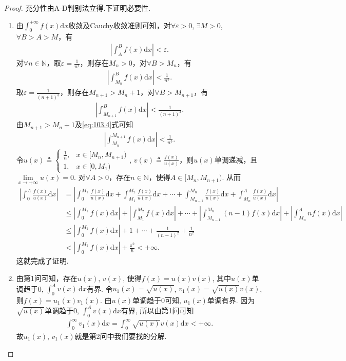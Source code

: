 \documentclass[../../main.tex]{subfiles}
\begin{document}
\begin{proof}
充分性由A-D判别法立得.下证明必要性.
\begin{enumerate}
\item 由$\int_0^{+\infty} f(x)\mathrm{d}x$收敛及Cauchy收敛准则可知，对$\forall \varepsilon >0$, $\exists M>0$, $\forall B>A>M$，有
\begin{align*}
\left| \int_A^B f(x)\mathrm{d}x \right| < \varepsilon.
\end{align*}
对$\forall n\in \mathbb{N}$，取$\varepsilon = \frac{1}{n^3}$，则存在$M_n>0$，对$\forall B>M_n$，有
\begin{align}
\left| \int_{M_n}^B f(x)\mathrm{d}x \right| < \frac{1}{n^3}. \label{eq:103.4}
\end{align}
取$\varepsilon = \frac{1}{(n+1)^3}$，则存在$M_{n+1}>M_n+1$，对$\forall B>M_{n+1}$，有
\begin{align*}
\left| \int_{M_{n+1}}^B f(x)\mathrm{d}x \right| < \frac{1}{(n+1)^3}.
\end{align*}
由$M_{n+1}>M_n+1$及\eqref{eq:103.4}式可知
\begin{align*}
\left| \int_{M_n}^{M_{n+1}} f(x)\mathrm{d}x \right| < \frac{1}{n^3}.
\end{align*}
令$u(x) \triangleq \begin{cases} 
\frac{1}{n}, & x\in [M_n, M_{n+1}) \\
1, & x\in [0, M_1)
\end{cases}$, $v(x) \triangleq \frac{f(x)}{u(x)}$，则$u(x)$单调递减，且$\lim\limits_{x\rightarrow +\infty} u(x) = 0$.
对$\forall A>0$，存在$n\in \mathbb{N}$，使得$A\in [M_n, M_{n+1})$. 从而
\begin{align*}
\left| \int_0^A \frac{f(x)}{u(x)}\mathrm{d}x \right| &= \left| \int_0^{M_1} \frac{f(x)}{u(x)}\mathrm{d}x + \int_{M_1}^{M_2} \frac{f(x)}{u(x)}\mathrm{d}x + \cdots + \int_{M_{n-1}}^{M_n} \frac{f(x)}{u(x)}\mathrm{d}x + \int_{M_n}^A \frac{f(x)}{u(x)}\mathrm{d}x \right| \\
&\leqslant \left| \int_0^{M_1} f(x)\mathrm{d}x \right| + \left| \int_{M_1}^{M_2} f(x)\mathrm{d}x \right| + \cdots + \left| \int_{M_{n-1}}^{M_n} (n-1)f(x)\mathrm{d}x \right| + \left| \int_{M_n}^A nf(x)\mathrm{d}x \right| \\
&\leqslant \left| \int_0^{M_1} f(x)\mathrm{d}x \right| + 1 + \cdots + \frac{1}{(n-1)^2} + \frac{1}{n^2} \\
&< \left| \int_0^{M_1} f(x)\mathrm{d}x \right| + \frac{\pi^2}{6} < +\infty.
\end{align*}
这就完成了证明.

\item 由第1问可知，存在$u(x)$, $v(x)$, 使得$f(x)=u(x)v(x)$, 其中$u(x)$单调趋于0, $\int_0^A v(x)\,\mathrm{d}x$有界. 令$u_1(x)=\sqrt{u(x)}$, $v_1(x)=\sqrt{u(x)}v(x)$, 则$f(x)=u_1(x)v_1(x)$. 由$u(x)$单调趋于0可知, $u_1(x)$单调有界. 因为$\sqrt{u(x)}$单调趋于0, $\int_0^A v(x)\mathrm{d}x$有界, 所以由第1问可知
\begin{align*}
\int_0^{\infty} v_1(x)\mathrm{d}x=\int_0^{\infty} \sqrt{u(x)}v(x)\mathrm{d}x<+\infty.
\end{align*}
故$u_1(x)$, $v_1(x)$就是第2问中我们要找的分解.
\end{enumerate}

\end{proof}
\end{document}
